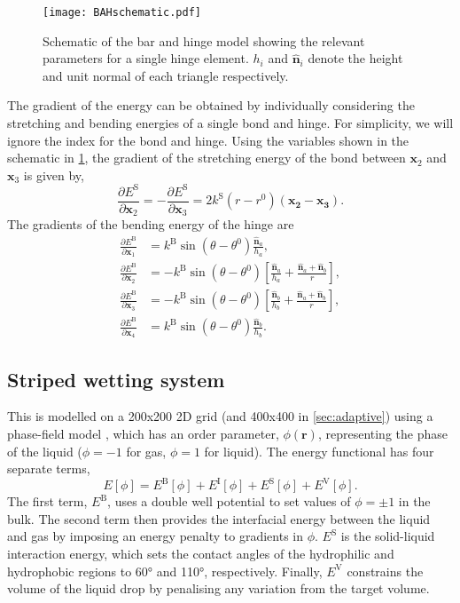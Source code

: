 \documentclass[aip,jcp,reprint,twocolumn]{revtex4-1}
\begin{document}
\begin{figure}[htb]
  \texttt{[image: BAHschematic.pdf]}
  \caption{\label{fig:BAHschematic}
    Schematic of the bar and hinge model showing the relevant parameters for a single hinge element.
    $h_i$ and $\bm{\hat{n}}_i$ denote the height and unit normal of each triangle respectively.
  }
\end{figure}
The gradient of the energy can be obtained by individually considering the stretching and bending energies of a single bond and hinge.
For simplicity, we will ignore the index for the bond and hinge.
Using the variables shown in the schematic in \cref{fig:BAHschematic}, the gradient of the stretching energy of the bond between $\bm{x}_2$ and $\bm{x}_3$ is given by,
\begin{equation}
  \frac{\partial E^\mathrm{S}}{\partial \bm{x}_2} = - \frac{\partial E^\mathrm{S}}{\partial \bm{x}_3} =
    2 k^\mathrm{S} (r - r^0) (\bm{x_2} - \bm{x_3}).
\end{equation}
The gradients of the bending energy of the hinge are
\begin{align}
  \frac{\partial E^\mathrm{B}}{\partial \bm{x}_1} &= k^\mathrm{B} \sin(\theta - \theta^0) \frac{\bm{\hat{n}}_a}{h_a}, \\
  \frac{\partial E^\mathrm{B}}{\partial \bm{x}_2} &= - k^\mathrm{B} \sin(\theta - \theta^0) \left[\frac{\bm{\hat{n}}_a}{h_a} + \frac{\bm{\hat{n}}_a + \bm{\hat{n}}_b}{r}\right], \\
  \frac{\partial E^\mathrm{B}}{\partial \bm{x}_3} &= - k^\mathrm{B} \sin(\theta - \theta^0) \left[\frac{\bm{\hat{n}}_b}{h_b} + \frac{\bm{\hat{n}}_a + \bm{\hat{n}}_b}{r}\right], \\
  \frac{\partial E^\mathrm{B}}{\partial \bm{x}_4} &= k^\mathrm{B} \sin(\theta - \theta^0) \frac{\bm{\hat{n}}_b}{h_b}.
\end{align}

\subsection{Striped wetting system}
This is modelled on a 200x200 2D grid (and 400x400 in \cref{sec:adaptive}) using a phase-field model \cite{Panter2019b}, which has an order parameter, $\phi(\bm{r})$, representing the phase of the liquid ($\phi=-1$ for gas, $\phi=1$ for liquid).
The energy functional has four separate terms,
\begin{equation} \label{eq:phasefield}
  E[\phi] = E^\mathrm{B}[\phi] + E^\mathrm{I}[\phi] + E^\mathrm{S}[\phi] + E^\mathrm{V}[\phi].
\end{equation}
The first term, $E^\mathrm{B}$, uses a double well potential to set values of $\phi=\pm1$ in the bulk.
The second term then provides the interfacial energy between the liquid and gas by imposing an energy penalty to gradients in $\phi$.
$E^\mathrm{S}$ is the solid-liquid interaction energy, which sets the contact angles of the hydrophilic and hydrophobic regions to 60\si{\degree} and 110\si{\degree}, respectively.
Finally, $E^\mathrm{V}$ constrains the volume of the liquid drop by penalising any variation from the target volume.
\end{document}
